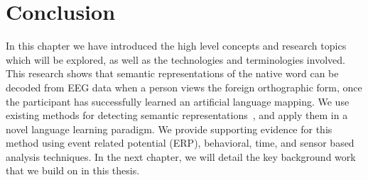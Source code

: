 \section{Conclusion}

In this chapter we have introduced the high level concepts and research topics 
which will be explored, as well as the technologies and terminologies involved.  
This research shows that semantic representations of the native word can be 
decoded from EEG data when a person views the foreign orthographic form, once 
the participant has successfully learned an artificial language mapping.  We 
use existing methods for detecting semantic representations~\cite{Sudre2012}, 
and apply them in a novel language learning paradigm. We provide supporting 
evidence for this method using event related potential (ERP), behavioral, time, 
and sensor based analysis techniques. In the next chapter, we will detail the 
key background work that we build on in this thesis. 

